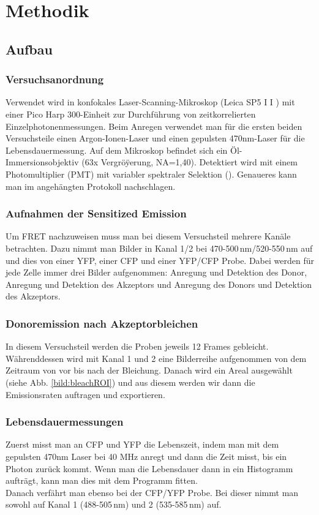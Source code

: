 
\chapter{Methodik}

\section{Aufbau}

\subsection{Versuchsanordnung}

Verwendet wird in konfokales Laser-Scanning-Mikroskop (Leica SP5 I I ) mit einer Pico Harp
300-Einheit zur Durchführung von zeitkorrelierten Einzelphotonenmessungen. Beim Anregen verwendet man für die ersten beiden Versuchsteile einen Argon-Ionen-Laser 
und einen gepulsten 470nm-Laser für die Lebensdauermessung. Auf dem Mikroskop befindet sich ein Öl-Immersionsobjektiv (63x Vergröÿerung, NA=1,40). Detektiert wird 
mit einem Photomultiplier (PMT) mit variabler spektraler Selektion (\cite{FRETSkript}). 
Genaueres kann man im angehängten Protokoll nachschlagen.

\subsection{Aufnahmen der Sensitized Emission}

Um FRET nachzuweisen muss man bei diesem Versuchsteil mehrere Kanäle betrachten. Dazu nimmt man Bilder in Kanal 1/2 
bei 470-500\,nm/520-550\,nm auf und dies von einer YFP, einer CFP und einer YFP/CFP Probe. Dabei werden für jede Zelle immer drei Bilder 
aufgenommen: Anregung und Detektion des Donor, Anregung und Detektion des Akzeptors und Anregung des Donors und Detektion des Akzeptors.


\subsection{Donoremission nach Akzeptorbleichen}

In diesem Versuchsteil werden die Proben jeweils 12 Frames gebleicht. Währenddessen wird mit Kanal 1 und 2 eine Bilderreihe 
aufgenommen von dem Zeitraum von vor bis nach der Bleichung. Danach wird ein Areal ausgewählt (siehe Abb. \ref{bild:bleachROI}) und aus 
diesem werden wir dann die Emissionsraten auftragen und exportieren. 

\subsection{Lebensdauermessungen}

Zuerst misst man an CFP und YFP die Lebenszeit, indem man mit dem gepulsten 470nm Laser bei 40 MHz anregt und dann die Zeit misst, bis ein Photon zurück kommt. 
Wenn man die Lebensdauer dann in ein Histogramm aufträgt, kann man dies mit dem Programm fitten.\\
Danach verfährt man ebenso bei der CFP/YFP Probe. Bei dieser nimmt man sowohl auf Kanal 1 (488-505\,nm) und 2 (535-585\,nm) auf.